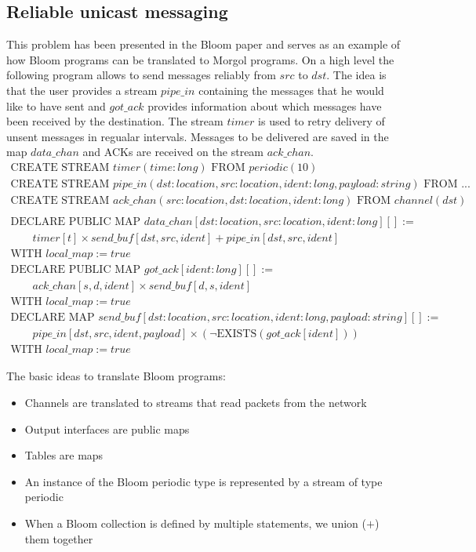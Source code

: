 \documentclass[11pt]{article}
\begin{document}
\subsection{Reliable unicast messaging}
This problem has been presented in the Bloom paper and serves as an example of how Bloom programs can be translated to Morgol programs.
On a high level the following program allows to send messages reliably from $src$ to $dst$.
The idea is that the user provides a stream $pipe\_in$ containing the messages that he would like to have sent and $got\_ack$ provides information about which messages have been received by the destination.
The stream $timer$ is used to retry delivery of unsent messages in regualar intervals.
Messages to be delivered are saved in the map $data\_chan$ and ACKs are received on the stream $ack\_chan$.
\[
\begin{array}{l}
\text{CREATE STREAM } timer(time: long) \text{ FROM } periodic(10) \\
\text{CREATE STREAM } pipe\_in(dst : location, src : location, ident : long, payload : string) \text{ FROM } ... \\
\text{CREATE STREAM } ack\_chan(src : location, dst : location, ident : long) \text{ FROM } channel(dst)\\
\\
\text{DECLARE PUBLIC MAP } data\_chan [dst : location, src : location, ident : long][] := \\
\qquad timer[t] \times send\_buf[dst, src, ident] + pipe\_in[dst, src, ident]\\
\text{WITH } local\_map := true \\
\text{DECLARE PUBLIC MAP } got\_ack [ident : long][] := \\
\qquad ack\_chan[s, d, ident] \times send\_buf[d, s, ident]\\
\text{WITH } local\_map := true \\
\text{DECLARE MAP } send\_buf [dst : location, src : location, ident : long, payload : string][] := \\
\qquad pipe\_in[dst, src, ident, payload] \times (\neg\text{EXISTS}(got\_ack[ident])) \\
\text{WITH } local\_map := true
\end{array}
\]

The basic ideas to translate Bloom programs:
\begin{itemize}
\item Channels are translated to streams that read packets from the network
\item Output interfaces are public maps
\item Tables are maps
\item An instance of the Bloom periodic type is represented by a stream of type periodic
\item When a Bloom collection is defined by multiple statements, we union ($+$) them together
\end{itemize} 
\end{document}
